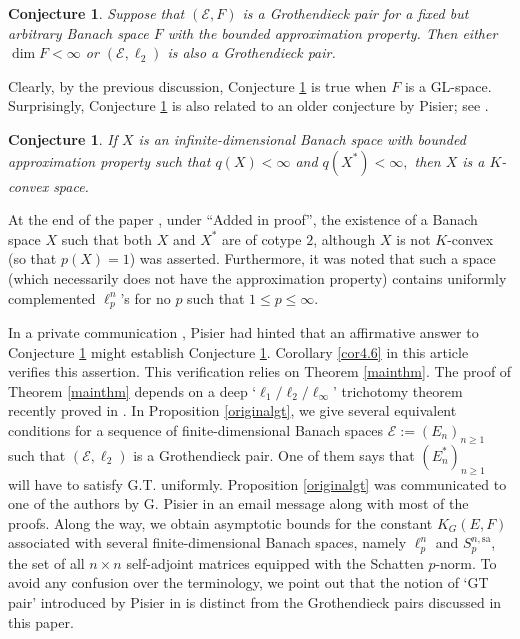 \documentclass[a4paper,oneside,11pt, reqno]{amsart}
\numberwithin{equation}{section}
\newtheorem{conjecture}[theorem]{\bf Conjecture}
\theoremstyle{plain}
\begin{document}
\begin{conjecture}\label{Conpis}  Suppose that $(\mathcal{E},F)$ is a Grothendieck pair for a fixed but arbitrary Banach space $F$ with the bounded approximation property. Then either $\dim F<\infty$ or $(\mathcal{E},\ell_2)$ is also a Grothendieck pair.
\end{conjecture}
Clearly, by the previous discussion, Conjecture \ref{Conpis} is true  when $F$ is a GL-space. Surprisingly, Conjecture \ref{Conpis} is also related to an older conjecture by Pisier; see \cite[Final remarks (i)]{PisierDuality}.
\begin{conjecture}\label{Pisann}
If $X$ is an infinite-dimensional Banach space with bounded approximation property such that $q(X)<\infty$ and $q(X^*)<\infty,$ then $X$ is a $K$-convex space. 
\end{conjecture}
At the end of the paper \cite{Pisann}, under ``Added in proof'', the existence of a Banach space $X$ such that both $X$ and $X^*$ are of cotype $2$, although $X$ is not $K$-convex (so that $p(X) = 1$) was asserted. Furthermore, it was noted that such a space (which necessarily does not have the approximation property) contains uniformly complemented $\ell_p^n$'s for no $p$ such that $1 \leqslant p \leqslant \infty$.

In a private communication \cite{Pisier17}, Pisier had hinted that an affirmative answer to Conjecture \ref{Pisann} might establish Conjecture \ref{Conpis}. Corollary \ref{cor4.6} in this article verifies this assertion. 
This verification relies on Theorem \ref{mainthm}. The proof of Theorem \ref{mainthm} depends on a deep `$\ell_1/ \ell_2/ \ell_\infty$' trichotomy theorem recently proved in \cite{XOR games and GT}. 
In Proposition \ref{originalgt}, we give several equivalent conditions for a sequence of finite-dimensional Banach spaces $\mathcal E:=(E_n)_{n\geqslant 1}$ such that $(\mathcal E,\ell_2)$ is a Grothendieck pair. One of them says that $(E_n^*)_{n\geqslant 1}$ will have to satisfy G.T. uniformly. Proposition \ref{originalgt} was communicated to one of the authors by G. Pisier in an email message \cite{Pisier17} along with most of the proofs. 
Along the way, we obtain asymptotic bounds for the constant $K_G(E,F)$ associated with several finite-dimensional Banach spaces, namely $\ell_p^n$ and $S_p^{n,\text{sa}}$, the set of all $n\times n$ self-adjoint matrices equipped with the Schatten $p$-norm. 
To avoid any confusion over the terminology, we point out that the notion of `GT pair'  introduced by Pisier in \cite{Pisier} is distinct from the Grothendieck pairs discussed in this paper. 
\end{document}

